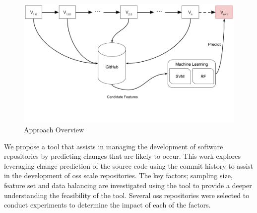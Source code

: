 \begin{figure}[t]
    \centering
        \includegraphics[width=1.0\textwidth]{images/overview}
    \caption{Approach Overview}
    \label{fig:overview}
\end{figure}



We propose a tool that assists in managing the development of software repositories by predicting changes that are likely to occur. This work explores leveraging change prediction of the source code using the commit history to assist in the development of \gls{oss} scale repositories. The key factors; sampling size, feature set and data balancing are investigated using the tool to provide a deeper understanding the feasibility of the tool. Several \gls{oss} repositories were selected to conduct experiments to determine the impact of each of the factors.

